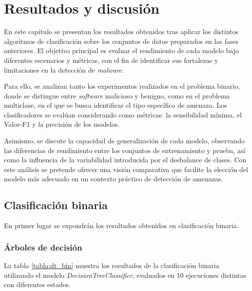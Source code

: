 \chapter{Resultados y discusión}
\label{ch:resultados}

En este capítulo se presentan los resultados obtenidos tras aplicar los distintos algoritmos de clasificación sobre los conjuntos de datos preparados en las fases anteriores. El objetivo principal es evaluar el rendimiento de cada modelo bajo diferentes escenarios y métricas, con el fin de identificar sus fortalezas y limitaciones en la detección de \textit{malware}.

\vspace{1em}

Para ello, se analizan tanto los experimentos realizados en el problema binario, donde se distingue entre \textit{software} malicioso y benigno, como en el problema multiclase, en el que se busca identificar el tipo específico de amenaza. Los clasificadores se evalúan considerando como métricas: la sensibilidad mínima, el Valor-F1 y la precisión de los modelos.

\vspace{1em}

Asimismo, se discute la capacidad de generalización de cada modelo, observando las diferencias de rendimiento entre los conjuntos de entrenamiento y prueba, así como la influencia de la variabilidad introducida por el desbalance de clases. Con este análisis se pretende ofrecer una visión comparativa que facilite la elección del modelo más adecuado en un contexto práctico de detección de amenazas.

\newpage
\section{Clasificación binaria}
\label{sec:clas_binaria}

En primer lugar se expondrán los resultados obtenidos en clasificación binaria.

\subsection{Árboles de decisión}
\label{subsec:dt_bin}

La tabla \ref{tabla:dt_bin} muestra los resultados de la clasificación binaria utilizando el modelo \textit{DecisionTreeClassifier}, evaluados en 10 ejecuciones distintas con diferentes estados.

\vspace{1em}

